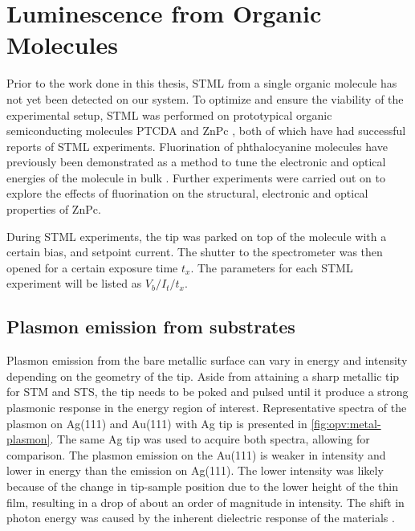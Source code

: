 
\chapter{Luminescence from Organic Molecules}
\label{ch:opv}

Prior to the work done in this thesis, \ac{STML} from a single organic molecule has not yet been detected on our system. To optimize and ensure the viability of the experimental setup, \ac{STML} was performed on prototypical organic semiconducting molecules \ac{PTCDA} \citep{Rzeznicka2011, Kimura2019} and \ac{ZnPc} \citep{Zhang2016, Doppagne2017, Zhang2017, Imada2016, Doppagne2018, Miwa2019}, both of which have had successful reports of \ac{STML} experiments. Fluorination of phthalocyanine molecules have previously been demonstrated as a method to tune the electronic and optical energies of the molecule in bulk \citep{schwarze2016band, warren2019controlling}. Further experiments were carried out on  to explore the effects of fluorination on the structural, electronic and optical properties of ZnPc.

During \ac{STML} experiments, the tip was parked on top of the molecule with a certain bias, and setpoint current. The shutter to the spectrometer was then opened for a certain exposure time $t_x$. The parameters for each \ac{STML} experiment will be listed as $V_b/I_t/t_x$.


\section{Plasmon emission from substrates}

Plasmon emission from the bare metallic surface can vary in energy and intensity depending on the geometry of the tip. Aside from attaining a sharp metallic tip for \ac{STM} and \ac{STS}, the tip needs to be poked and pulsed until it produce a strong plasmonic response in the energy region of interest. Representative spectra of the plasmon on Ag(111) and Au(111) with Ag tip is presented in \autoref{fig:opv:metal-plasmon}. The same Ag tip was used to acquire both spectra, allowing for comparison. The plasmon emission on the Au(111) is weaker in intensity and lower in energy than the emission on Ag(111). The lower intensity was likely because of the change in tip-sample position due to the lower height of the thin film, resulting in a drop of about an order of magnitude in intensity. The shift in photon energy was caused by the inherent dielectric response of the materials \citep{olmon2012optical, yang2015optical}.

